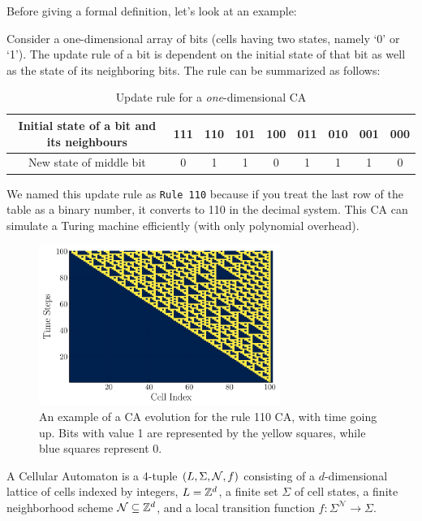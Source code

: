 \documentclass[11pt, oneside]{scrbook}
\begin{document}
Before giving a formal definition, let's look at an example:
\begin{example}
    \label{eg:rule110}
    Consider a one-dimensional array of bits (\ie cells having two states, namely `0' or `1'). The update rule of a bit is dependent on the initial state of that bit as well as the state of its neighboring bits. The rule can be summarized as follows:
    \begin{table}[H]
        \centering
        \begin{tabular}{ | c | c | c | c | c | c | c | c | c | }
            \hline
            Initial state of a bit and its neighbours & 111 & 110 & 101 & 100 & 011 & 010 & 001 & 000 \\
            \hline
            New state of middle bit                   & 0   & 1   & 1   & 0   & 1   & 1   & 1   & 0   \\
            \hline
        \end{tabular}
        \caption{Update rule for a \textit{one}-dimensional CA}
        \label{tab:rule110}
    \end{table}
    We named this update rule as \verb|Rule 110| because if you treat the last row of the table as a binary number, it converts to 110 in the decimal system. This CA can simulate a Turing machine efficiently (with only polynomial overhead).
    \begin{figure}[H]
        \centering
        \includegraphics[width = 0.7\textwidth]{rule110_cellular_automaton.png}
        \caption{An example of a CA evolution for the rule 110 CA, with time going up. Bits with value 1 are
            represented by the yellow squares, while blue squares represent 0.}
        \label{fig:rule110}
    \end{figure} \noindent

\end{example}

\begin{definition}
    A Cellular Automaton is a 4-tuple \(\qty(L, \Sigma, \mathcal{N}, f)\) consisting of a $d$-dimensional lattice of cells indexed by integers, $L = \mathbb Z^d$, a finite set $\Sigma$ of cell states, a finite neighborhood scheme $\mathcal{N} \subseteq \mathbb Z^d$, and a local transition function $f: \Sigma^{\mathcal{N}} \to \Sigma$.
\end{definition}
\end{document}
